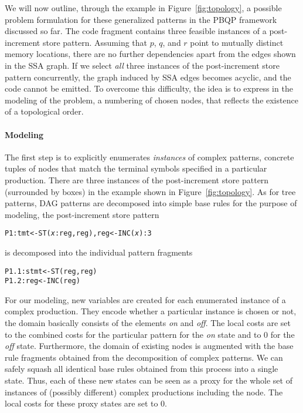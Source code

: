 We will now outline, through the example in
Figure~\ref{fig:topology}, a possible problem formulation for these
generalized patterns in the PBQP framework discussed so far. 
The code fragment contains three feasible instances of a post-increment
store pattern. Assuming that $p$, $q$, and $r$ point to mutually
distinct memory locations, there are no further dependencies apart
from the edges shown in the SSA graph. If we select \emph{all} three
instances of the post-increment store pattern concurrently, the graph induced by SSA edges becomes acyclic, and the code cannot be emitted. To overcome this difficulty, the idea is to express in the modeling of the problem, a numbering of chosen nodes, that reflects the existence of a topological order. 


\paragraph{Modeling}
The first step is to explicitly enumerates \emph{instances\/} of complex
patterns, \ie
concrete tuples of nodes that match the terminal symbols specified in
a particular production. There are three instances of the
post-increment store pattern (surrounded by boxes) in the example shown
in Figure~\ref{fig:topology}.
As for tree patterns, DAG patterns are decomposed into simple base
rules for the purpose of modeling, \eg the post-increment store
pattern
\begin{alltt}
  P1: tmt <- ST(\textit{x}:reg, reg), reg <- INC(\textit{x}) : 3
\end{alltt}
is decomposed into the individual pattern fragments
\begin{alltt}
  P1.1: stmt <- ST(reg, reg)
  P1.2: reg  <- INC(reg)
\end{alltt}

For our modeling, new variables are created for each enumerated
instance of a complex production. They encode whether a particular
instance is chosen or not, \ie the domain basically consists of the
elements \textit{on} and \textit{off}. The local costs are set to the
combined costs for the particular pattern for the \textit{on} state
and to 0 for the \textit{off} state. Furthermore, the domain of
existing nodes is augmented with the base rule fragments obtained from
the decomposition of complex patterns.  We can safely squash all
identical base rules obtained from this process into a single
state. Thus, each of these new states can be seen as a proxy for the
whole set of instances of (possibly different) complex productions
including the node. The local costs for these proxy states are set to 0.

